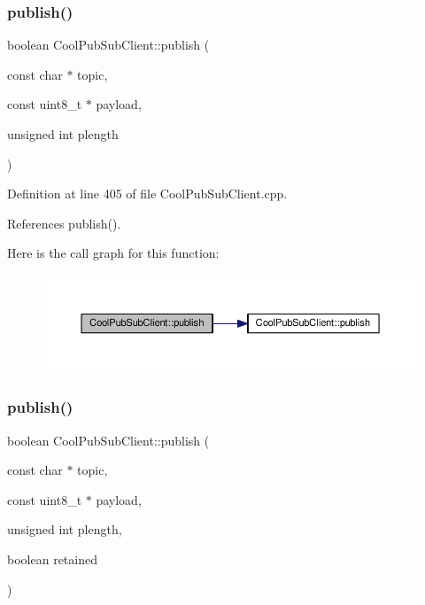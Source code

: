 \subsubsection{\texorpdfstring{publish()}{publish()}\hspace{0.1cm}{\footnotesize\ttfamily [3/4]}}
{\footnotesize\ttfamily boolean Cool\+Pub\+Sub\+Client\+::publish (\begin{DoxyParamCaption}\item[{const char $\ast$}]{topic,  }\item[{const uint8\+\_\+t $\ast$}]{payload,  }\item[{unsigned int}]{plength }\end{DoxyParamCaption})}



Definition at line 405 of file Cool\+Pub\+Sub\+Client.\+cpp.



References publish().

Here is the call graph for this function\+:\nopagebreak
\begin{figure}[H]
\begin{center}
\leavevmode
\includegraphics[width=350pt]{d8/d4b/class_cool_pub_sub_client_abf184c0968a6655b68b5fdfbbc0c87d1_cgraph}
\end{center}
\end{figure}
\mbox{\label{class_cool_pub_sub_client_adef968760eb87b70e3fed03e60da76f7}} 
\subsubsection{\texorpdfstring{publish()}{publish()}\hspace{0.1cm}{\footnotesize\ttfamily [4/4]}}
{\footnotesize\ttfamily boolean Cool\+Pub\+Sub\+Client\+::publish (\begin{DoxyParamCaption}\item[{const char $\ast$}]{topic,  }\item[{const uint8\+\_\+t $\ast$}]{payload,  }\item[{unsigned int}]{plength,  }\item[{boolean}]{retained }\end{DoxyParamCaption})}



